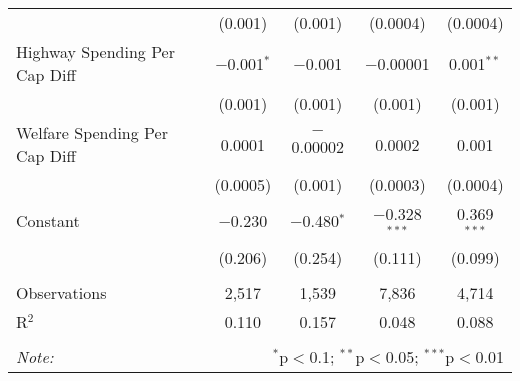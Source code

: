 \begin{table}[!htbp]
\begin{tabular}{@{\extracolsep{5pt}}lcccc}
  & (0.001) & (0.001) & (0.0004) & (0.0004) \\ 
  Highway Spending Per Cap Diff & $-$0.001$^{*}$ & $-$0.001 & $-$0.00001 & 0.001$^{**}$ \\ 
  & (0.001) & (0.001) & (0.001) & (0.001) \\ 
  Welfare Spending Per Cap Diff & 0.0001 & $-$0.00002 & 0.0002 & 0.001 \\ 
  & (0.0005) & (0.001) & (0.0003) & (0.0004) \\ 
  Constant & $-$0.230 & $-$0.480$^{*}$ & $-$0.328$^{***}$ & 0.369$^{***}$ \\ 
  & (0.206) & (0.254) & (0.111) & (0.099) \\ 
 \hline \\[-1.8ex] 
Observations & 2,517 & 1,539 & 7,836 & 4,714 \\ 
R$^{2}$ & 0.110 & 0.157 & 0.048 & 0.088 \\ 
\hline 
\hline \\[-1.8ex] 
\textit{Note:}  & \multicolumn{4}{r}{$^{*}$p$<$0.1; $^{**}$p$<$0.05; $^{***}$p$<$0.01} \\ 
\end{tabular} 
\end{table} 
